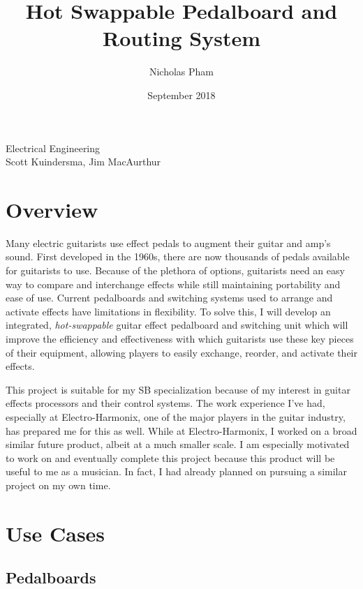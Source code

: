 \documentclass{article}
\title{Hot Swappable Pedalboard and Routing System}
\author{Nicholas Pham}
\date{September 2018}
\begin{document}
\maketitle
\begin{center}
    Electrical Engineering \\
    Scott Kuindersma, Jim MacAurthur
\end{center}

\section{Overview}

Many electric guitarists use effect pedals to augment their guitar and amp's sound.  First developed in the 1960s, there are now thousands of pedals available for guitarists to use.  Because of the plethora of options, guitarists need an easy way to compare and interchange effects while still maintaining portability and ease of use.  Current pedalboards and switching systems used to arrange and activate effects have limitations in flexibility.  To solve this, I will develop an integrated, \emph{hot-swappable} guitar effect pedalboard and switching unit which will improve the efficiency and effectiveness with which guitarists use these key pieces of their equipment, allowing players to easily exchange, reorder, and activate their effects.

This project is suitable for my SB specialization because of my interest in guitar effects processors and their control systems.  The work experience I've had, especially at Electro-Harmonix, one of the major players in the guitar industry, has prepared me for this as well.  While at Electro-Harmonix, I worked on a broad similar future product, albeit at a much smaller scale.  I am especially motivated to work on and eventually complete this project because this product will be useful to me as a musician.  In fact, I had already planned on pursuing a similar project on my own time.


\section{Use Cases}

\subsection{Pedalboards}
\end{document}
